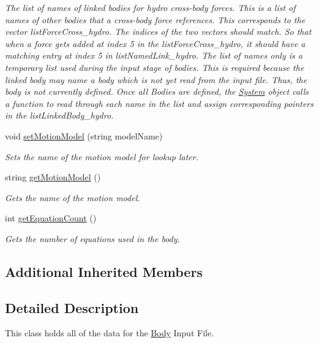 \begin{DoxyCompactItemize}
\begin{DoxyCompactList}\small\item\em The list of names of linked bodies for hydro cross-\/body forces. This is a list of names of other bodies that a cross-\/body force references. This corresponds to the vector list\-Force\-Cross\-\_\-hydro. The indices of the two vectors should match. So that when a force gets added at index 5 in the list\-Force\-Cross\-\_\-hydro, it should have a matching entry at index 5 in list\-Named\-Link\-\_\-hydro. The list of names only is a temporary list used during the input stage of bodies. This is required because the linked body may name a body which is not yet read from the input file. Thus, the body is not currently defined. Once all Bodies are defined, the \hyperlink{class_system}{System} object calls a function to read through each name in the list and assign corresponding pointers in the list\-Linked\-Body\-\_\-hydro. \end{DoxyCompactList}\item 
void \hyperlink{class_body_ae6fe245f2504eac2e3486f28df3c0ca3}{set\-Motion\-Model} (string model\-Name)
\begin{DoxyCompactList}\small\item\em Sets the name of the motion model for lookup later. \end{DoxyCompactList}\item 
string \hyperlink{class_body_ab4340cac445ae26ae751a08c35155386}{get\-Motion\-Model} ()
\begin{DoxyCompactList}\small\item\em Gets the name of the motion model. \end{DoxyCompactList}\item 
int \hyperlink{class_body_a07a8f186c02f0d5bad4beded83949571}{get\-Equation\-Count} ()
\begin{DoxyCompactList}\small\item\em Gets the number of equations used in the body. \end{DoxyCompactList}\end{DoxyCompactItemize}
\subsection*{Additional Inherited Members}


\subsection{Detailed Description}
This class holds all of the data for the \hyperlink{class_body}{Body} Input File. 

